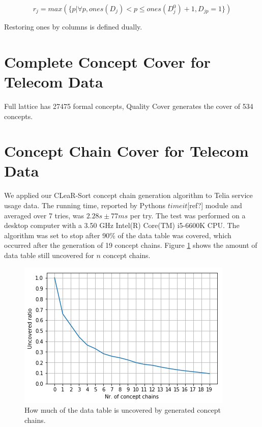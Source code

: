 \documentclass[acmconf,authordraft]{acmart}
\begin{document}
\begin{equation}
r_j = max(\{p | \forall p, ones(D_j) < p \leq ones(D^0_j)+1, D_{jp}=1\})
\label{ones}
\end{equation}

Restoring ones by columns is defined dually.

\section{Complete Concept Cover for Telecom Data}
Full lattice has 27475 formal concepts, Quality Cover generates the cover of 534 concepts.

\section{Concept Chain Cover for Telecom Data}

We applied our CLeaR-Sort  concept chain generation algorithm to Telia service usage data. The running time, reported by Pythons $timeit$[ref?] module and averaged over 7 tries, was $2.28 s \pm 77 ms$ per try. The test was performed on a desktop computer with a 3.50 GHz Intel(R) Core(TM) i5-6600K CPU. The algorithm was set to stop after 90\% of the data table was covered, which occurred after the generation of 19 concept chains. Figure \ref{fig:cc_cover} shows the amount of data table still uncovered for $n$ concept chains.

\begin{figure}[ht]
  \centering
  \label{fig:cc_cover}
  \includegraphics[width=\linewidth]{telia_ccc}
  \caption{How much of the data table is uncovered by generated concept chains.}
\end{figure}
\end{document}
